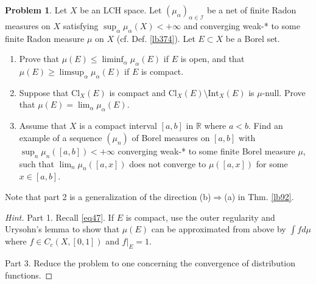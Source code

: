 \documentclass[12pt,b5paper,notitlepage]{article}
\theoremstyle{definition}
\newtheorem{prob}{\color{red}Problem}[section]
\theoremstyle{plain}
\newcommand{\Rbb}{\mathbb R}
\newcommand{\dps}{\displaystyle}
\newcommand{\Int}{\mathrm{Int}}
\newcommand{\Cl}{\mathrm{Cl}}
\newcommand{\SI}{\mathscr I}
\numberwithin{equation}{section}
\begin{document}
\begin{prob}
Let $X$ be an LCH space. Let $(\mu_\alpha)_{\alpha\in\SI}$ be a net of finite Radon measures on $X$ satisfying $\sup_\alpha \mu_\alpha(X)<+\infty$ and converging weak-* to some finite Radon measure $\mu$ on $X$ (cf. Def. \ref{lb374}). Let $E\subset X$ be a Borel set.
\begin{enumerate}
\item Prove that $\dps\mu(E)\leq\liminf_\alpha\mu_\alpha(E)$ if $E$ is open, and that $\dps\mu(E)\geq\limsup_\alpha\mu_\alpha(E)$ if $E$ is compact.
\item Suppose that $\Cl_X(E)$ is compact and $\Cl_X(E)\setminus\Int_X(E)$ is $\mu$-null. Prove that $\mu(E)=\lim_\alpha\mu_\alpha(E)$.
\item Assume that $X$ is a compact interval $[a,b]$ in $\Rbb$ where $a<b$. Find an example of a sequence $(\mu_n)$ of Borel measures on $[a,b]$ with $\sup_n\mu_n([a,b])<+\infty$ converging weak-* to some finite Borel measure $\mu$, such that $\lim_n\mu_n([a,x])$ does not converge to $\mu([a,x])$ for some $x\in[a,b]$.
\end{enumerate}
\end{prob}

Note that part 2 is a generalization of the direction (b)$\Rightarrow$(a) in Thm. \ref{lb92}.

\begin{proof}[Hint]
Part 1. Recall \eqref{eq47}. If $E$ is compact, use the outer regularity and Urysohn's lemma to show that $\mu(E)$ can be approximated from above by $\int fd\mu$ where $f\in C_c(X,[0,1])$ and $f|_E=1$.

Part 3. Reduce the problem to one concerning the convergence of distribution functions.
\end{proof}



\begin{comment}
\begin{prob}
Let $[a,b]\subset\Rbb$ with $a<b$. Let $(\mu_\alpha)_{\alpha\in\SI}$ be a net of finite Borel measures on $[a,b]$ converging weak-* to some finite Borel measure $\mu$. Assume that $\mu\{x\}=0$ for each $x\in[a,b]$. Prove that $(\rho_\alpha)_{\alpha\in\SI}$ converges uniformly to $\rho$, where $\rho_\alpha(x)=\mu([a,x])$ and $\rho(x)=\mu([a,x])$ for each $x\in[a,b]$.
\end{prob}
\end{comment}
\end{document}
